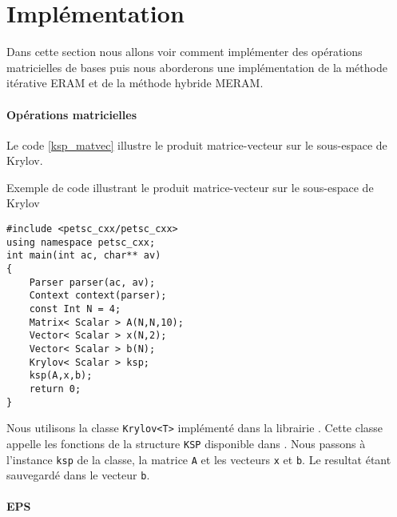 %

\section{Implémentation}

Dans cette section nous allons voir comment implémenter des opérations matricielles de bases puis nous aborderons une implémentation de la méthode itérative ERAM et de la méthode hybride MERAM.

\paragraph{Opérations matricielles}

Le code \ref{ksp_matvec} illustre le produit matrice-vecteur sur le sous-espace de Krylov.

\begin{algorithm}[h]
  \caption{Exemple de code illustrant le produit matrice-vecteur sur le sous-espace de Krylov}
  \label{ksp_matvec}
\begin{verbatim}
#include <petsc_cxx/petsc_cxx>
using namespace petsc_cxx;
int main(int ac, char** av)
{
    Parser parser(ac, av);
    Context context(parser);
    const Int N = 4;
    Matrix< Scalar > A(N,N,10);
    Vector< Scalar > x(N,2);
    Vector< Scalar > b(N);
    Krylov< Scalar > ksp;
    ksp(A,x,b);
    return 0;
}
\end{verbatim}
\end{algorithm}

Nous utilisons la classe \verb#Krylov<T># implémenté dans la librairie \petscx. Cette classe appelle les fonctions de la structure \verb#KSP# disponible dans \petsc. Nous passons à l'instance \verb#ksp# de la classe, la matrice \verb#A# et les vecteurs \verb#x# et \verb#b#. Le resultat étant sauvegardé dans le vecteur \verb#b#.

\paragraph{EPS}

